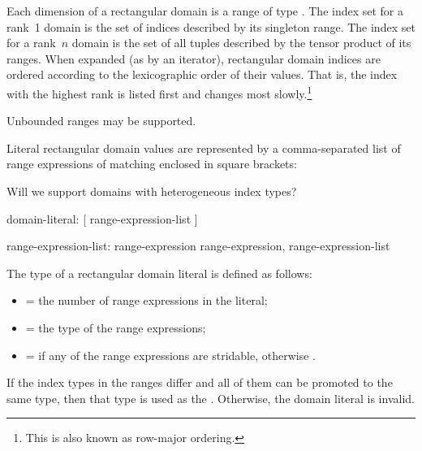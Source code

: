 Each dimension of a rectangular domain is a range of
type   .  The index set for a rank~1 domain is the set of indices
described by its singleton range.  The index set for a rank~$n$
domain is the set of all  tuples described by the
tensor product of its ranges.  When expanded (as by an iterator), rectangular domain indices are ordered
according to the lexicographic order of their values.  That is, the index with
the highest rank is listed first and changes most slowly.\footnote{This is also
known as row-major ordering.}



\begin{future}
Unbounded ranges may be supported.
\end{future}


Literal rectangular domain values are represented by a comma-separated
list of range expressions of matching  enclosed in
square brackets:

\begin{future}
Will we support domains with heterogeneous index types?
\end{future}

\begin{syntax}
domain-literal:
  [ range-expression-list ]

range-expression-list:
  range-expression
  range-expression, range-expression-list
\end{syntax}

\noindent The type of a rectangular domain literal is defined as follows:

\begin{itemize}
\item {} = the number of range expressions in the literal;
\item {} = the type of the range expressions;
\item {} =  if any of the range expressions
are stridable, otherwise .
\end{itemize}
\noindent If the index types in the ranges differ and all of them can be
promoted to the same type, then that type is used as the .
Otherwise, the domain literal is invalid.

